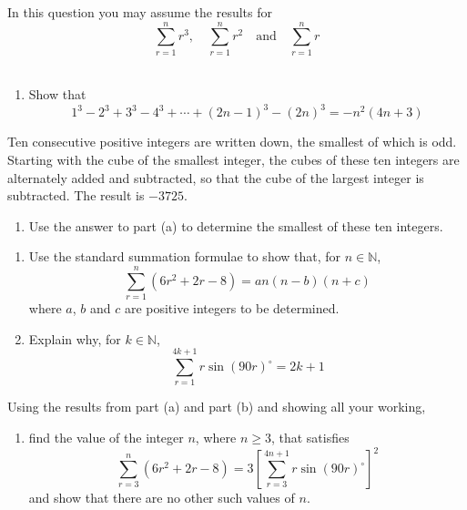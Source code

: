 \documentclass[leqno]{article}
\begin{document}
\begin{enumerate}[
  label=\textbf{\arabic*.},
  leftmargin=*,
  topsep=0pt,
  partopsep=0pt,
  parsep=0pt
]
In this question you may assume the results for
\[\sum_{r=1}^{n} r^3, \quad \sum_{r=1}^{n} r^2 \quad \text{and} \quad \sum_{r=1}^{n} r\] \\
\begin{enumerate}[label=\textbf{(\alph*)}]
  \item Show that
  \[1^3 - 2^3 + 3^3 - 4^3 + \cdots + (2n-1)^3 - (2n)^3 = -n^2(4n+3)\] 
\end{enumerate}
Ten consecutive positive integers are written down, the smallest of which is odd. Starting with the cube of the smallest integer, the cubes of these ten integers are alternately added and subtracted, so that the cube of the largest integer is subtracted. The result is $-3725$. \\
\begin{enumerate}[label=\textbf{(\alph*)}, resume]
  \item Use the answer to part (a) to determine the smallest of these ten integers.  \\
\end{enumerate}

\newpage

\questionitem

\begin{enumerate}[label=\textbf{(\alph*)}]
  \item Use the standard summation formulae to show that, for $n \in \mathbb{N}$,
  \[\sum_{r=1}^{n} \left(6r^2 + 2r - 8\right) = an(n-b)(n+c)\]
  where $a$, $b$ and $c$ are positive integers to be determined.  \\
  \item Explain why, for $k \in \mathbb{N}$,
  \[\sum_{r=1}^{4k+1} r\sin\left(90r\right)^\circ = 2k+1\] 
\end{enumerate}
Using the results from part (a) and part (b) and showing all your working, \\
\begin{enumerate}[label=\textbf{(\alph*)}, resume]
  \item find the value of the integer $n$, where $n \geq 3$, that satisfies
  \[\sum_{r=3}^{n} \left(6r^2 + 2r - 8\right) = 3\left[\sum_{r=3}^{4n+1} r\sin\left(90r\right)^\circ\right]^2\]
  and show that there are no other such values of $n$.  \\
\end{enumerate}

\newpage


\end{enumerate}
\end{document}
